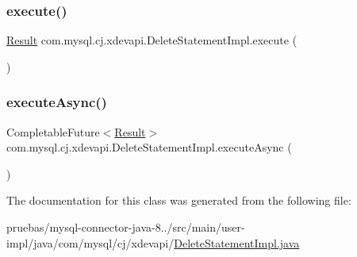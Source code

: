 \subsubsection{\texorpdfstring{execute()}{execute()}}
{\footnotesize\ttfamily \mbox{\hyperlink{interfacecom_1_1mysql_1_1cj_1_1xdevapi_1_1_result}{Result}} com.\+mysql.\+cj.\+xdevapi.\+Delete\+Statement\+Impl.\+execute (\begin{DoxyParamCaption}{ }\end{DoxyParamCaption})}

\mbox{\label{classcom_1_1mysql_1_1cj_1_1xdevapi_1_1_delete_statement_impl_afc882987a4cfd437aa2b02685f10b3eb}} 
\subsubsection{\texorpdfstring{execute\+Async()}{executeAsync()}}
{\footnotesize\ttfamily Completable\+Future$<$\mbox{\hyperlink{interfacecom_1_1mysql_1_1cj_1_1xdevapi_1_1_result}{Result}}$>$ com.\+mysql.\+cj.\+xdevapi.\+Delete\+Statement\+Impl.\+execute\+Async (\begin{DoxyParamCaption}{ }\end{DoxyParamCaption})}



The documentation for this class was generated from the following file\+:\begin{DoxyCompactItemize}
\item 
pruebas/mysql-\/connector-\/java-\/8../src/main/user-\/impl/java/com/mysql/cj/xdevapi/\mbox{\hyperlink{_delete_statement_impl_8java}{Delete\+Statement\+Impl.\+java}}\end{DoxyCompactItemize}
